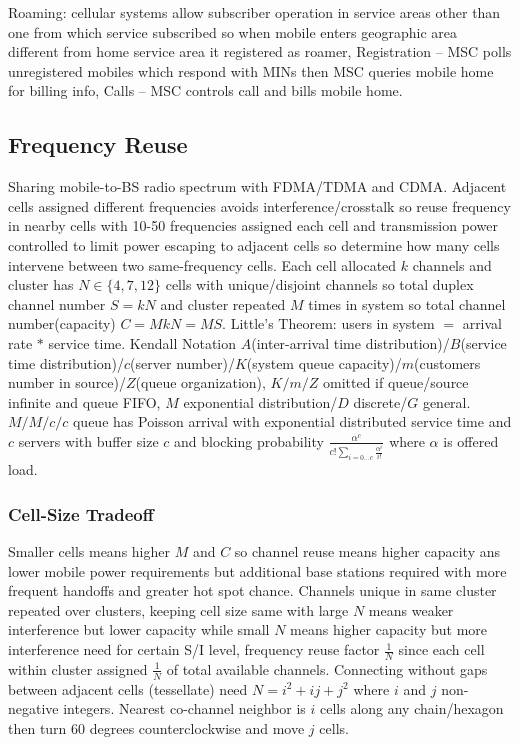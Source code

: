 \documentclass[9pt]{extarticle}
\begin{document}
\begin{multicols}{2}
Roaming: cellular systems allow subscriber operation in service areas other than one from which service subscribed so when mobile enters geographic area different from home service area it registered as roamer, Registration – MSC polls unregistered mobiles which respond with MINs then MSC queries mobile home for billing info, Calls – MSC controls call and bills mobile home.

\subsection{Frequency Reuse}

Sharing mobile-to-BS radio spectrum with FDMA/TDMA and CDMA. Adjacent cells assigned different frequencies avoids interference/crosstalk so reuse frequency in nearby cells with 10-50 frequencies assigned each cell and transmission power controlled to limit power escaping to adjacent cells so determine how many cells intervene between two same-frequency cells. Each cell allocated $k$ channels and cluster has $N\in\{4,7,12\}$ cells with unique/disjoint channels so total duplex channel number $S = kN$ and cluster repeated $M$ times in system so total channel number(capacity) $C = MkN = MS$. Little’s Theorem: users in system $=$ arrival rate $*$ service time. Kendall Notation $A$(inter-arrival time distribution)/$B$(service time distribution)/$c$(server number)/$K$(system queue capacity)/$m$(customers number in source)/$Z$(queue organization), $K/m/Z$ omitted if queue/source infinite and queue FIFO, $M$ exponential distribution/$D$ discrete/$G$ general. $M/M/c/c$ queue has Poisson arrival with exponential distributed service time and $c$ servers with buffer size $c$ and blocking probability $\frac{\alpha^c}{c!\sum_{i=0\dots{c}}\frac{\alpha^i}{i!}}$ where $\alpha$ is offered load. 

\subsubsection{Cell-Size Tradeoff}

Smaller cells means higher $M$ and $C$ so channel reuse means higher capacity ans lower mobile power requirements but additional base stations required with more frequent handoffs and greater hot spot chance. Channels unique in same cluster repeated over clusters, keeping cell size same with large $N$ means weaker interference but lower capacity while small $N$ means higher capacity but more interference need for certain S/I level, frequency reuse factor $\frac{1}{N}$ since each cell within cluster assigned $\frac{1}{N}$ of total available channels. Connecting without gaps between adjacent cells (tessellate) need $N=i^2+ij+j^2$ where $i$ and $j$ non-negative integers. Nearest co-channel neighbor is $i$ cells along any chain/hexagon then turn 60 degrees counterclockwise and move $j$ cells.


\end{multicols}
\end{document}
